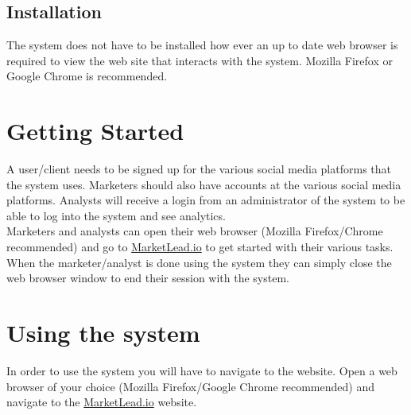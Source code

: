 \documentclass{article}
\begin{document}
		\subsection{Installation}%
			The system does not have to be installed how ever an up to date web browser is required to view the web site that interacts with the system. Mozilla Firefox or Google Chrome is recommended.

	\section{Getting Started}
		A user/client needs to be signed up for the various social media platforms that the system uses.
		Marketers should also have accounts at the various social media platforms.
		Analysts will receive a login from an administrator of the system to be able to log into the system and see analytics.\\
		Marketers and analysts can open their web browser (Mozilla Firefox/Chrome recommended) and go to \href{https://insuranceprofiling.herokuapp.com}{MarketLead.io} to get started with their various tasks.
		When the marketer/analyst is done using the system they can simply close the web browser window to end their session with the system.

	\section{Using the system}
		In order to use the system you will have to navigate to the website.
		Open a web browser of your choice (Mozilla Firefox/Google Chrome recommended) and navigate to the \href{https://insuranceprofiling.herokuapp.com}{MarketLead.io} website.
\end{document}
